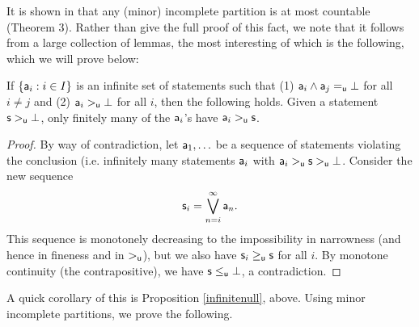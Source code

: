 \documentclass[11pt]{article}
\begin{document}
It is shown in \cite{villegas} that any (minor) incomplete partition is at most countable (Theorem 3). Rather than give the full proof of this fact, we note that it follows from a large collection of lemmas, the most interesting of which is the following, which we will prove below: 

\begin{prop}
If $\{\stmt[a]_i: i\in I\}$ is an infinite set of statements such that (1) $\stmt[a]_i \AND \stmt[a]_j =_{\stmt[u]}\impossibility$ for all $i\neq j$ and (2) $\stmt[a]_i>_{\stmt[u]}\impossibility$ for all $i$, then the following holds. Given a statement $\stmt>_{\stmt[u]}\impossibility$, only finitely many of the $\stmt[a]_i$'s have $\stmt[a]_i>_{\stmt[u]}\stmt$.  
\end{prop}
\begin{proof}
By way of contradiction, let $\stmt[a]_1,\ldots$ be a sequence of statements violating the conclusion (i.e. infinitely many statements $\stmt[a]_i$ with $\stmt[a]_i>_{\stmt[u]}\stmt>_{\stmt[u]}\impossibility$. Consider the new sequence $$\stmt_i = \bigOR\limits_{n=i}^{\infty}\stmt[a]_n.$$ This sequence is monotonely decreasing to the impossibility in narrowness (and hence in fineness and in $>_{\stmt[u]}$), but we also have $\stmt_i\geq_{\stmt[u]}\stmt$ for all $i$. By monotone continuity (the contrapositive), we have $\stmt[s]\leq_{\stmt[u]}\impossibility$, a contradiction. 
\end{proof}

A quick corollary of this is Proposition \ref{infinitenull}, above. Using minor incomplete partitions, we prove the following. 
\end{document}
